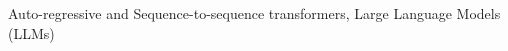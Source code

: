 \skillcategory{}{}
 Auto-regressive and Sequence-to-sequence transformers, Large Language Models (LLMs)\\ 
